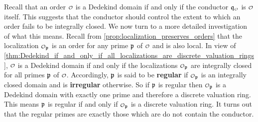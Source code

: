     Recall that an order \(\smc{O}\) is a Dedekind domain if and only if the conductor \(\mf{q}_{\smc{O}}\) is \(\smc{O}\) itself. This suggests that the conductor should control the extent to which an order fails to be integrally closed. We now turn to a more detailed investigation of what this means. Recall from \cref{prop:localization_preserves_orders} that the localization \(\smc{O}_{\mf{p}}\) is an order for any prime \(\mathfrak{p}\) of \(\smc{O}\) and is also local. In view of \cref{thm:Dedekind_if_and_only_if_all_localizations_are_discrete_valuation_rings}, \(\smc{O}\) is a Dedekind domain if and only if the localizations \(\smc{O}_{\mf{p}}\) are integrally closed for all primes \(\mathfrak{p}\) of \(\smc{O}\). Accordingly, \(\mathfrak{p}\) is said to be \textbf{regular} if \(\smc{O}_{\mf{p}}\) is an integrally closed domain and is \textbf{irregular} otherwise. So if \(\mathfrak{p}\) is regular then \(\smc{O}_{\mf{p}}\) is a Dedekind domain with exactly one prime and therefore a discrete valuation ring. This means \(\mathfrak{p}\) is regular if and only if \(\smc{O}_{\mf{p}}\) is a discrete valuation ring. It turns out that the regular primes are exactly those which are do not contain the conductor.

